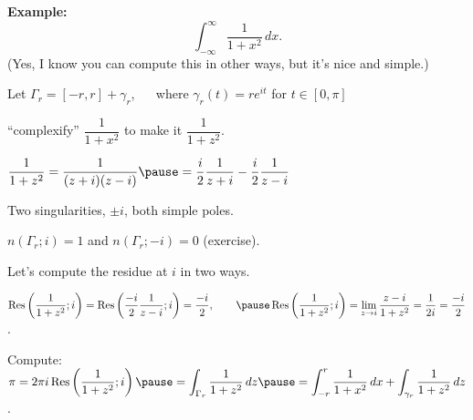 \documentclass[10pt,aspectratio=169]{beamer}
\begin{document}
\begin{frame}

\textbf{Example:}
\begin{equation*}
\int_{-\infty}^\infty \frac{1}{1+x^2} \, dx .
\end{equation*}
\pause
{\small (Yes, I know you can compute this in other ways, but it's nice and
simple.)}

\pause
\medskip

Let $\Gamma_r = [-r,r] + \gamma_r$,
~~
where $\gamma_r(t) =
re^{it}$ for $t \in [0,\pi]$

\vspace*{-8pt}
\hspace*{3in}%

\pause
\vspace*{-1.2in}

``complexify''
$\dfrac{1}{1+x^2}$ to make it $\dfrac{1}{1+z^2}$.

\medskip
\pause

$\displaystyle
\frac{1}{1+z^2} = \frac{1}{(z+i)(z-i)} \pause =
\frac{i}{2} \frac{1}{z+i} - 
\frac{i}{2} \frac{1}{z-i}$

\medskip
\pause

Two singularities, $\pm i$, both simple poles. 

$n(\Gamma_r;i) = 1$ and $n(\Gamma_r;-i) = 0$ \quad (exercise).

\medskip
\pause

Let's compute the residue at $i$ in two ways.

\medskip
\pause

$\displaystyle
\operatorname{Res}\left(\frac{1}{1+z^2};i\right) =
\operatorname{Res}\left(
\frac{-i}{2} \frac{1}{z-i};
i\right) = \frac{-i}{2} ,
\qquad
\pause
\operatorname{Res}\left(\frac{1}{1+z^2};i\right) =
\lim_{z \to i} \frac{z-i}{1+z^2}
=
\frac{1}{2i} = \frac{-i}{2}$.

\medskip
\pause

Compute: \quad
$\displaystyle
\pi 
=
2 \pi i \operatorname{Res}\left(\frac{1}{1+z^2};i\right)
\pause
=
\int_{\Gamma_r} \frac{1}{1+z^2} \, dz
\pause
=
\int_{-r}^r \frac{1}{1+x^2} \, dx
+
\int_{\gamma_r} \frac{1}{1+z^2} \, dz$.

\end{frame}
\end{document}
